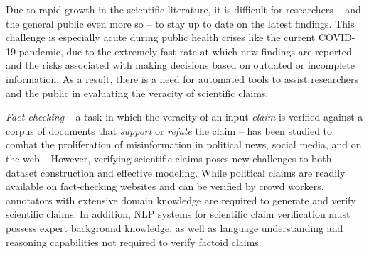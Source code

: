 



Due to rapid growth in the scientific literature, it is difficult for researchers -- and the general public even more so -- to stay up to date on the latest findings. This challenge is especially acute during public health crises like the current COVID-19 pandemic, due to the extremely fast rate at which new findings are reported and the risks associated with making decisions based on outdated or incomplete information. %
As a result, there is a need for automated tools to assist researchers and the public in evaluating the veracity of scientific claims. %


\emph{Fact-checking} -- a task in which the veracity of an input \emph{claim} is verified against a corpus of documents that \emph{support} or \emph{refute} the claim -- has been studied to combat the proliferation of misinformation in political news, social media, and on the web~\cite{Thorne2018FEVERAL,Hanselowski2019ARA}. However, verifying scientific claims poses new challenges to both dataset construction and effective modeling. While political claims are readily available on fact-checking websites and can be verified by crowd workers, annotators with extensive domain knowledge are required to generate and verify scientific claims. In addition, NLP systems for scientific claim verification must possess expert background knowledge, as well as language understanding and reasoning capabilities not required to verify factoid claims. %

